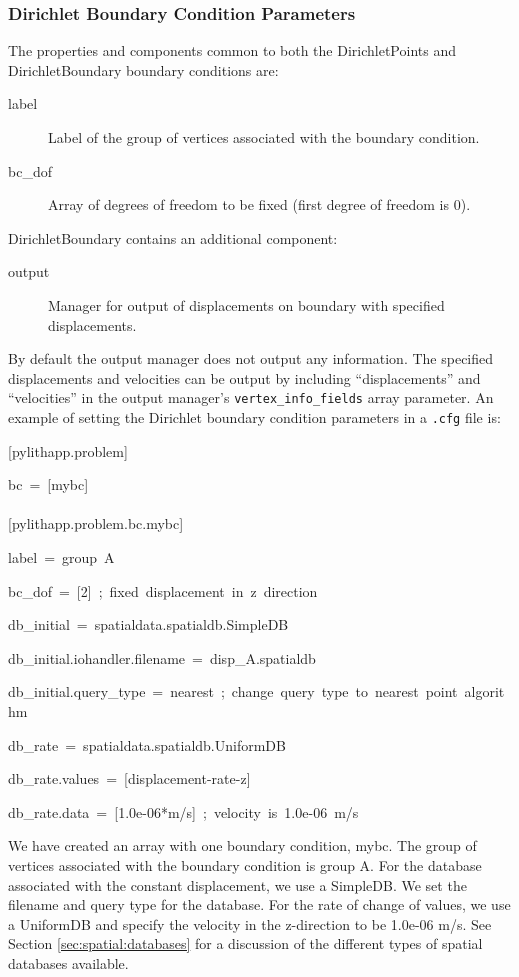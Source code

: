 \subsubsection{Dirichlet Boundary Condition Parameters}

The properties and components common to both the DirichletPoints and
DirichletBoundary boundary conditions are:
\begin{description}
\item [{label}] Label of the group of vertices associated with the boundary
condition.
\item [{bc\_dof}] Array of degrees of freedom to be fixed (first degree
of freedom is 0).
\end{description}
DirichletBoundary contains an additional component:
\begin{description}
\item [{output}] Manager for output of displacements on boundary with specified
displacements.
\end{description}
By default the output manager does not output any information. The
specified displacements and velocities can be output by including
``displacements'' and ``velocities'' in the output manager's \texttt{vertex\_info\_fields}
array parameter. An example of setting the Dirichlet boundary condition
parameters in a \texttt{.cfg} file is:
\begin{lyxcode}
{[}pylithapp.problem{]}

bc~=~{[}mybc{]}~\\
~\\
{[}pylithapp.problem.bc.mybc{]}

label~=~group~A~

bc\_dof~=~{[}2{]}~;~fixed~displacement~in~z~direction

db\_initial~=~spatialdata.spatialdb.SimpleDB

db\_initial.iohandler.filename~=~disp\_A.spatialdb

db\_initial.query\_type~=~nearest~;~change~query~type~to~nearest~point~algorithm

db\_rate~=~spatialdata.spatialdb.UniformDB

db\_rate.values~=~{[}displacement-rate-z{]}

db\_rate.data~=~{[}1.0e-06{*}m/s{]}~;~velocity~is~1.0e-06~m/s
\end{lyxcode}
We have created an array with one boundary condition, mybc. The group
of vertices associated with the boundary condition is group A. For
the database associated with the constant displacement, we use a SimpleDB.
We set the filename and query type for the database. For the rate
of change of values, we use a UniformDB and specify the velocity in
the z-direction to be 1.0e-06 m/s. See Section \vref{sec:spatial:databases}
for a discussion of the different types of spatial databases available.

